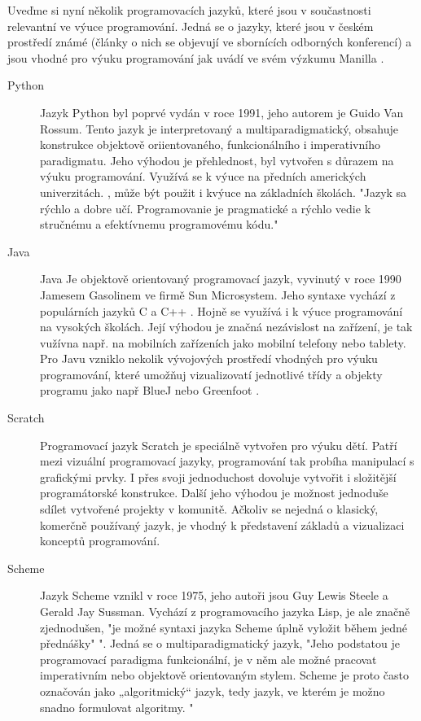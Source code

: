 \documentclass[FP,DP]{tulthesis}
\begin{document}
{{{{{{{\vspace{2mm}Uveďme si nyní několik programovacích jazyků, které jsou v součastnosti relevantní ve výuce programování. Jedná se o jazyky, které jsou v českém prostředí známé (články o nich se objevují ve sbornících odborných konferencí) a jsou vhodné pro výuku programování jak uvádí ve svém výzkumu Manilla  \citeyearpar{mannila}. 
\begin{description}
\item [Python] Jazyk Python byl poprvé vydán v roce 1991, jeho autorem je Guido Van Rossum. Tento jazyk je interpretovaný a multiparadigmatický, obsahuje konstrukce objektově oriientovaného, funkcionálního i imperativního paradigmatu. Jeho výhodou je přehlednost, byl vytvořen s důrazem na výuku programování. Využívá se k výuce na předních amerických univerzitách\citeyearpar{guo_2014}. , může být použit i kvýuce na základních školách. "Jazyk sa rýchlo a dobre učí. Programovanie je pragmatické a
rýchlo vedie k stručnému a efektívnemu programovému kódu." \citep{hajek2015}
\item [Java] Java Je objektově orientovaný programovací jazyk, vyvinutý v roce 1990 Jamesem Gasolinem ve firmě Sun Microsystem. Jeho syntaxe vychází z populárních jazyků C a C++  \citep{javamanual}. Hojně se využívá i k výuce programování na vysokých školách. Její výhodou je značná nezávislost na zařízení, je tak vužívna např. na mobilních zařízeních jako mobilní telefony nebo tablety. Pro Javu vzniklo nekolik vývojových prostředí vhodných pro výuku programování, které umožňuj vizualizovatí jednotlivé třídy a objekty programu jako např BlueJ  \citep{bluej} nebo Greenfoot \citep{greenfoot}.  
\item [Scratch] Programovací jazyk Scratch je speciálně vytvořen pro výuku dětí. Patří mezi vizuální programovací jazyky, programování tak probíha manipulací s grafickými prvky. I přes svoji jednoduchost dovoluje vytvořit i složitější programátorské konstrukce. Další jeho výhodou je možnost jednoduše sdílet vytvořené projekty v komunitě. Ačkoliv se nejedná o klasický, komerčně používaný jazyk, je vhodný k představení základů a vizualizaci konceptů programování.\citep{scratch}
\item [Scheme] Jazyk Scheme vznikl v roce 1975, jeho autoři jsou Guy Lewis Steele a Gerald Jay Sussman. Vychází z programovacího jazyka Lisp, je ale značně zjednodušen,  "je možné syntaxi jazyka Scheme úplně vyložit během jedné přednášky" \citep[s. 11]{scheme}". Jedná se o multiparadigmatický jazyk, "Jeho podstatou je programovací paradigma funkcionální, je v něm ale možné pracovat imperativním nebo objektově orientovaným stylem. Scheme je proto často označován jako „algoritmický“ jazyk, tedy jazyk, ve kterém je možno snadno formulovat algoritmy. \citep[s. 10]{scheme}"
\end{description}

}}}}}}}
\end{document}
